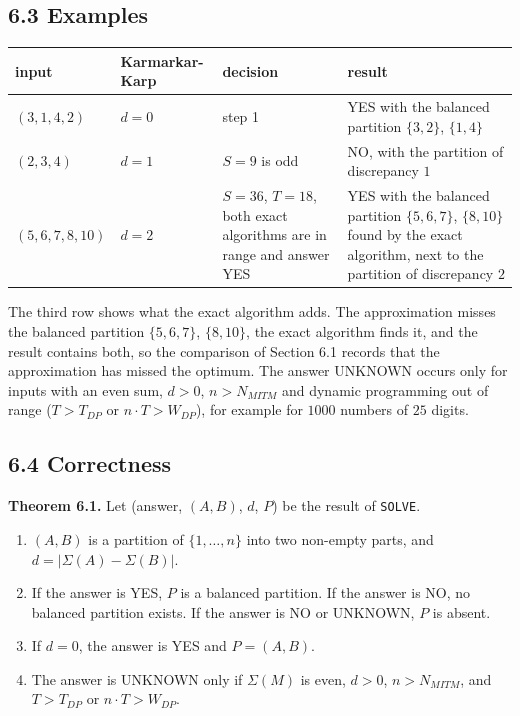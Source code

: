 \documentclass[
]{article}
\providecommand{\tightlist}{%
  \setlength{\itemsep}{0pt}\setlength{\parskip}{0pt}}
\begin{document}
\hypertarget{examples-3}{%
\subsection{6.3 Examples}\label{examples-3}}

\begin{longtable}[]{@{}>{\raggedright\arraybackslash}p{}>{\raggedright\arraybackslash}p{}>{\raggedright\arraybackslash}p{}>{\raggedright\arraybackslash}p{}@{}}
\toprule
input & Karmarkar-Karp & decision & result \\
\midrule
\endhead
\((3, 1, 4, 2)\) & \(d = 0\) & step 1 & YES with the balanced partition \(\lbrace 3, 2 \rbrace\),
\(\lbrace 1, 4 \rbrace\) \\
\midrule
\((2, 3, 4)\) & \(d = 1\) & \(S = 9\) is odd & NO, with the partition of discrepancy \(1\) \\
\midrule
\((5, 6, 7, 8, 10)\) & \(d = 2\) & \(S = 36\), \(T = 18\), both exact algorithms are in range and answer
YES & YES with the balanced partition \(\lbrace 5, 6, 7 \rbrace\),
\(\lbrace 8, 10 \rbrace\) found by the exact algorithm, next to the
partition of discrepancy \(2\) \\
\bottomrule
\end{longtable}

The third row shows what the exact algorithm adds. The approximation
misses the balanced partition \(\lbrace 5, 6, 7 \rbrace\),
\(\lbrace 8, 10 \rbrace\), the exact algorithm finds it, and the result
contains both, so the comparison of Section 6.1 records that the
approximation has missed the optimum. The answer UNKNOWN occurs only for
inputs with an even sum, \(d > 0\), \(n > N_{MITM}\) and dynamic
programming out of range (\(T > T_{DP}\) or \(n \cdot T > W_{DP}\)), for
example for \(1000\) numbers of \(25\) digits.

\hypertarget{correctness-4}{%
\subsection{6.4 Correctness}\label{correctness-4}}

\textbf{Theorem 6.1.} Let (answer, \((A, B)\), \(d\), \(P\)) be the
result of \texttt{SOLVE}.

\begin{enumerate}
\def\labelenumi{\arabic{enumi}.}
\tightlist
\item
  \((A, B)\) is a partition of \(\lbrace 1, \dots, n \rbrace\) into two
  non-empty parts, and \(d = |\Sigma(A) - \Sigma(B)|\).
\item
  If the answer is YES, \(P\) is a balanced partition. If the answer is
  NO, no balanced partition exists. If the answer is NO or UNKNOWN,
  \(P\) is absent.
\item
  If \(d = 0\), the answer is YES and \(P = (A, B)\).
\item
  The answer is UNKNOWN only if \(\Sigma(M)\) is even, \(d > 0\),
  \(n > N_{MITM}\), and \(T > T_{DP}\) or \(n \cdot T > W_{DP}\).
\end{enumerate}
\end{document}
